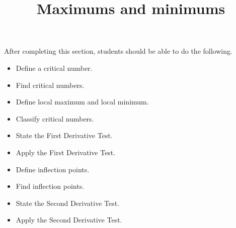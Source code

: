 \documentclass{ximera}
\title{Maximums and minimums}
\begin{document}
\begin{abstract}
\end{abstract}
\maketitle

\begin{sectionOutcomes}

After completing this section, students should be able to do the following.

\begin{itemize}
	\item Define a critical number.
	\item Find critical numbers.
	\item Define local maximum and local minimum.
	\item Classify critical numbers.
	\item State the First Derivative Test.
	\item Apply the First Derivative Test.
	\item Define inflection points.
	\item Find inflection points.
	\item State the Second Derivative Test.
	\item Apply the Second Derivative Test.
\end{itemize}
\end{sectionOutcomes}
\end{document}
